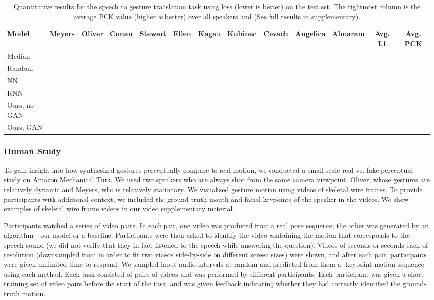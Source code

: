 \documentclass[10pt,twocolumn,letterpaper]{article}
\begin{document}
\begin{table*}
\small
\begin{center}
\setlength{\tabcolsep}{3pt}
\begin{tabular}{lcccccccccccc}
\toprule
Model & Meyers & Oliver & Conan & Stewart & Ellen & Kagan & Kubinec & Covach & Angelica & Almaram & \textbf{Avg. L1} & \textbf{Avg. PCK}  \tabularnewline
\midrule
Median                     &  &  &  &  &  &  &  &  &  &  &  &  \tabularnewline
Random                     &  &  &  &  &  &  &  &  &  &   &  &  \tabularnewline
NN~\cite{vggish}           &  &  &  &  &  &  &  &  &  &  &  &  \tabularnewline
\midrule
RNN~\cite{shlizermanaudio} &  &  &  &  &  &  &  &  &  &   &  &  \tabularnewline
\midrule
Ours, no GAN               &  &  &  &  &  &  &  &  &  &    &  &  \tabularnewline
Ours, GAN                  &  &  &  &  &  &  &  &  &  &  &  &  \tabularnewline
\bottomrule
\end{tabular}
\end{center}
\vspace{-4mm}
\caption{Quantitative results for the speech to gesture translation task using  loss (lower is better) on the test set. The rightmost column is the average PCK value (higher is better) over all speakers and  (See full results in supplementary).}
\label{tab-L1}
\end{table*}

\subsubsection{Human Study}
To gain insight into how synthesized gestures perceptually compare to real motion, we conducted a small-scale real vs. fake perceptual study on Amazon Mechanical Turk. We used two speakers who are always shot from the same camera viewpoint: Oliver, whose gestures are relatively dynamic and Meyers, who is relatively stationary.
We visualized gesture motion using videos of skeletal wire frames. To provide participants with additional context, we included the ground truth mouth and facial keypoints of the speaker in the videos. We show examples of skeletal wire frame videos in our video supplementary material.

Participants watched a series of video pairs. In each pair, one video was produced from a real pose sequence; the other was generated by an algorithm---our model or a baseline. Participants were then asked to identify the video containing the motion that corresponds to the speech sound (we did not verify that they in fact listened to the speech while answering the question). Videos of  seconds or  seconds each of resolution  (downsampled from  in order to fit two videos side-by-side on different screen sizes) were shown, and after each pair, participants were given unlimited time to respond. We sampled  input audio intervals at random and predicted from them a -keypoint motion sequence using each method. Each task consisted of  pairs of videos and was performed by  different participants. Each participant was given a short training set of  video pairs before the start of the task, and was given feedback indicating whether they had correctly identified the ground-truth motion. 
\end{document}
